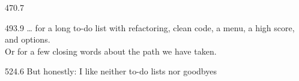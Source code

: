 \documentclass{aslab}
\begin{document}
\begin{region}{470.7}
\end{region}

\begin{region}[pitch=13.2]{493.9}
\dots{} for a long to-do list with refactoring, clean code, a menu, a high
score, and options.\\
Or for a few closing words about the path we have taken.
\end{region}

\begin{region}{524.6}
But honestly: I like neither to-do lists nor goodbyes 
\end{region}
\end{document}
